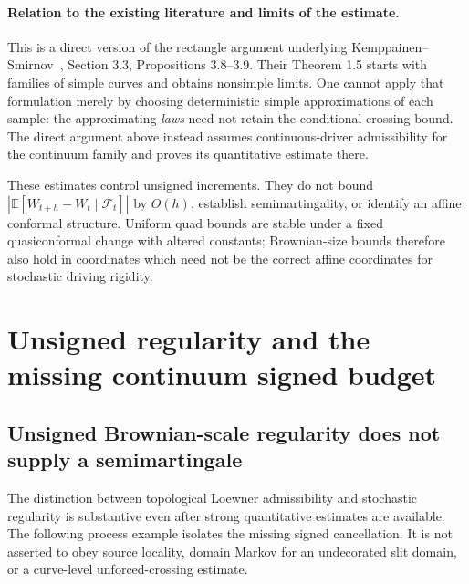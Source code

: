 \documentclass[11pt]{article}
\theoremstyle{definition}\newtheorem{definition}[theorem]{Definition}
\theoremstyle{remark}\newtheorem{remark}[theorem]{Remark}
\begin{document}
\paragraph{Relation to the existing literature and limits of the estimate.}
This is a direct version of the rectangle argument underlying
Kemppainen--Smirnov~\cite{ks}, Section 3.3, Propositions 3.8--3.9. Their
Theorem 1.5 starts with families of simple curves and obtains nonsimple
limits. One cannot apply that formulation merely by choosing
deterministic simple approximations of each sample: the approximating
\emph{laws} need not retain the conditional crossing bound. The direct
argument above instead assumes continuous-driver admissibility for
the continuum family and proves its quantitative estimate there.

These estimates control unsigned increments. They do not bound
$|\mathbb E[W_{t+h}-W_t\mid\mathcal F_t]|$ by $O(h)$,
establish semimartingality, or identify an affine conformal structure.
Uniform quad bounds are stable under a fixed quasiconformal change
with altered constants; Brownian-size bounds therefore also hold in
coordinates which need not be the correct affine coordinates for
stochastic driving rigidity.

\section{Unsigned regularity and the missing continuum signed budget}
\label{sec:continuum-regularity-gap}

\subsection{Unsigned Brownian-scale regularity does not supply a semimartingale}
\label{sec:unsigned-not-semimartingale}

The distinction between topological Loewner admissibility and stochastic
regularity is substantive even after strong quantitative estimates are
available. The following process example isolates the missing signed
cancellation. It is not asserted to obey source locality, domain Markov
for an undecorated slit domain, or a curve-level unforced-crossing estimate.
\end{document}
